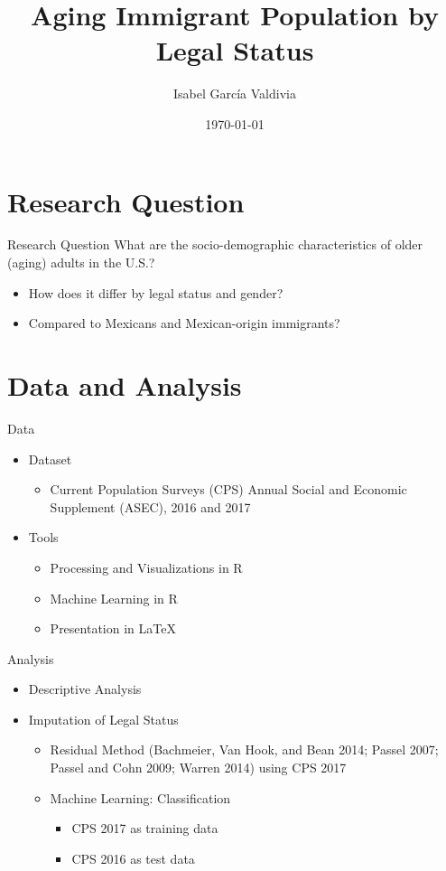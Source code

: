 \documentclass{beamer}	%
\title{Aging Immigrant Population by Legal Status}
\date{\today}	%
\author{Isabel Garc\'ia Valdivia}
\institute{University of California, Berkeley\\
Department of Sociology}
\begin{document}
  \maketitle
  \tableofcontents
  \clearpage
  
\section{Research Question}
  \begin{frame}{Research Question}
What are the socio-demographic characteristics of older (aging) adults in the U.S.?
\begin{itemize}
	\item How does it differ by legal status and gender?
	\item Compared to Mexicans and Mexican-origin immigrants?
\end{itemize}
  \end{frame}

\section{Data and Analysis}
 	\begin{frame}{Data}
		\begin{itemize}
			\item Dataset
				\begin{itemize}
					\item Current Population Survey\textsc{}s (CPS) Annual Social and Economic Supplement (ASEC), 2016 and 2017
				\end{itemize}
			\item Tools
				\begin{itemize}
					\item Processing and Visualizations in R
					\item Machine Learning in R
					\item Presentation in LaTeX
				\end{itemize}
		\end{itemize}
	\end{frame}
	\begin{frame}{Analysis}
		\begin{itemize}
			\item Descriptive Analysis
			\item Imputation of Legal Status
				\begin{itemize}
					\item Residual Method (Bachmeier, Van Hook, and Bean 2014; Passel 2007; Passel and Cohn 2009; Warren 2014) using CPS 2017
					\item Machine Learning: Classification
					\begin{itemize}
						\item CPS 2017 as training data
						\item CPS 2016 as test data
					\end{itemize}
				\end{itemize}
		\end{itemize}
	\end{frame}
\end{document}
